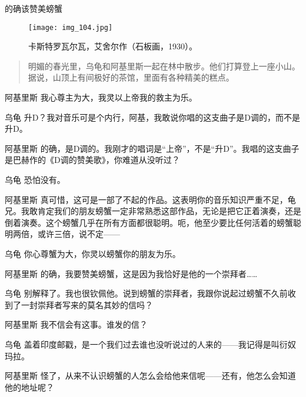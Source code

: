 

\begin{dialog}{的确该赞美螃蟹}

\begin{figure}
\texttt{[image: img\_104.jpg]}
\caption[卡斯特罗瓦尔瓦，艾舍尔作。]
  {卡斯特罗瓦尔瓦，艾舍尔作（石板画，1930）。}
\end{figure}

\begin{quote}
明媚的春光里，乌龟和阿基里斯一起在林中散步。他们打算登上一座小山。据说，山顶上有间极好的茶馆，里面有各种精美的糕点。
\end{quote}

\begin{dialogue}

\item[阿基里斯]我心尊主为大，我灵以上帝我的救主为乐。

\item[乌龟]升D？我对音乐可是个内行，阿基，我敢说你唱的这支曲子是D调的，而不是升D。

\item[阿基里斯]的确，是D调的。我刚才的唱词是“上帝”，不是“升D”。我唱的这支曲子是巴赫作的《D调的赞美歌》，你难道从没听过？

\item[乌龟]恐怕没有。

\item[阿基里斯]真可惜，这可是一部了不起的作品。这表明你的音乐知识严重不足，龟兄。我敢肯定我们的朋友螃蟹一定非常熟悉这部作品，无论是把它正着演奏，还是倒着演奏。这个螃蟹几乎在所有方面都很聪明。呃，他至少要比任何活着的螃蟹聪明两倍，或许三倍，说不定——

\item[乌龟]你心尊蟹为大，你灵以螃蟹你的朋友为乐。

\item[阿基里斯]的确，我要赞美螃蟹，这是因为我恰好是他的一个崇拜者……

\item[乌龟]别解释了。我也很钦佩他。说到螃蟹的崇拜者，我跟你说起过螃蟹不久前收到了一封崇拜者写来的莫名其妙的信吗？

\item[阿基里斯]我不信会有这事。谁发的信？

\item[乌龟]盖着印度邮戳，是一个我们过去谁也没听说过的人来的——我记得是叫衍奴玛拉。

\item[阿基里斯]怪了，从来不认识螃蟹的人怎么会给他来信呢——还有，他怎么会知道他的地址呢？


\end{dialogue}
\end{dialog}

